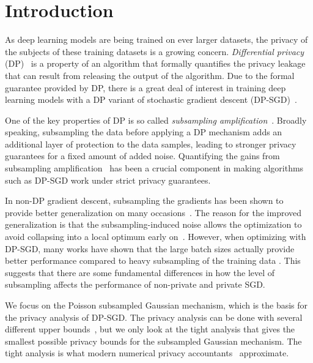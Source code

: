 \documentclass{article}
\theoremstyle{plain}
\theoremstyle{definition}
\theoremstyle{remark}
\begin{document}
\section{Introduction}

As deep learning models are being trained on ever larger datasets, the privacy
of the subjects of these training datasets is a growing concern.
\emph{Differential privacy} (DP)~\citep{dworkCalibratingNoiseSensitivity2006} is
a property of an algorithm that formally quantifies the privacy leakage that can
result from releasing the output of the algorithm. Due to the formal guarantee
provided by DP, there is a great deal of interest in training deep learning
models with a DP variant of stochastic gradient descent
(DP-SGD)~\citep{songStochasticGradientDescent2013,
bassilyPrivateEmpiricalRisk2014,abadiDeepLearningDifferential2016}.

One of the key properties of DP is so called \emph{subsampling amplification}~\citep{liSamplingAnonymizationDifferential2012,beimelBoundsSampleComplexity2014}. 
Broadly speaking, subsampling the data before 
applying a DP mechanism adds an additional layer of protection to the data samples,
leading to stronger privacy guarantees for a fixed amount of added noise. Quantifying 
the gains from subsampling amplification~\citep{abadiDeepLearningDifferential2016,zhuPoissionSubsampledRenyi2019,KoskelaJH20,zhuOptimalAccountingDifferential2022} 
has been a crucial component in making algorithms such as DP-SGD
work under strict privacy guarantees.

In non-DP gradient descent, subsampling the gradients 
has been shown to provide better generalization on many 
occasions~\citep{hardtTrainFasterGeneralize2016,mouGeneralizationBoundsSGLD2018,kleinbergAlternativeViewWhen2018}. 
The reason for the improved generalization is that the subsampling-induced noise
allows the optimization to avoid collapsing into a local optimum early 
on~\citep{keskarLargeBatchTrainingDeep2017}. 
However, when optimizing with DP-SGD, many works have shown that the large 
batch sizes actually provide better performance compared to heavy subsampling
of the training data \cite{mcmahanLearningDifferentiallyPrivate2018, deUnlocking2022, mehtaLargeScaleTransfer2023}. 
This suggests that there are some fundamental differences in how 
the level of subsampling affects the performance of non-private and private 
SGD.

We focus on the Poisson subsampled Gaussian mechanism, which is the basis for the privacy analysis 
of DP-SGD. The privacy analysis can be done with several different 
upper bounds~\citep{abadiDeepLearningDifferential2016,zhuPoissionSubsampledRenyi2019,KoskelaJH20},
but we only look at the tight analysis that gives the smallest possible privacy bounds
for the subsampled Gaussian mechanism. The tight analysis is what modern numerical privacy 
accountants~\citep{KoskelaJH20,koskelaTightDifferentialPrivacy2021,GopiLW21,doroshenkoConnectDotsTighter2022a,alghamdiSaddlePointMethodDifferential2023} approximate.
\end{document}
